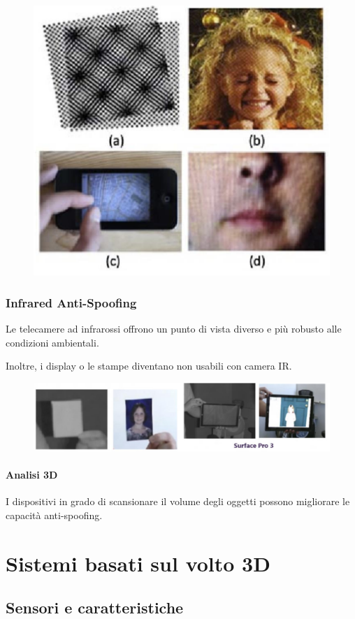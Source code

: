 \documentclass{report}
\begin{document}
\begin{figure}[ht]
    \centering
    \includegraphics[width=0.6\linewidth]{images/pattern.png}
\end{figure}

\subsection{Infrared Anti-Spoofing}
Le telecamere ad infrarossi offrono un punto di vista diverso 
e più robusto alle condizioni ambientali.

\noindent Inoltre, i display o le stampe diventano non usabili 
con camera IR.

\begin{figure}[ht]
    \centering
    \includegraphics[width=1\linewidth]{images/infrared.png}
\end{figure}

\subsubsection{Analisi 3D}
I dispositivi in grado di scansionare il volume degli oggetti 
possono migliorare le capacità anti-spoofing.

\chapter{Sistemi basati sul volto 3D}

\section{Sensori e caratteristiche}
\end{document}
